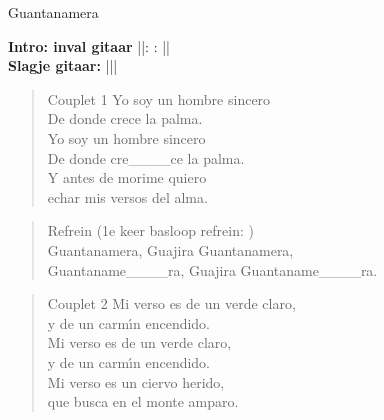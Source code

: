 \begin{song}[son]{Guantanamera}

\textbf{Intro: inval gitaar}
||:  : ||\\
\textbf{Slagje gitaar:}
|\hspace{1em}\hspace{1em}|\hspace{2em}|\\

\begin{verse}{Couplet 1}
  \hspace{1em} Yo soy un hombre sincero
  \\
  \hspace{1em} De donde crece la palma.
  \\
  \hspace{1em} Yo soy un hombre sincero
  \\
  De donde cre\_\_\_\_ce la palma.
  \\
  Y antes de morime quiero
  \\
  echar mis versos del alma.
\end{verse}

\begin{verse}{Refrein}
  (1e keer basloop refrein: )\\
  Guantanamera, \hspace{1em} Guajira Guantanamera,\hspace{1em} 
  \\
  Guantaname\_\_\_\_ra, Guajira Guantaname\_\_\_\_ra.
\end{verse}

\begin{verse}{Couplet 2}
  \hspace{1em} Mi verso es de un verde claro,\\
  \hspace{1em} y de un carm\'{\i}n encendido. \\
  \hspace{1em} Mi verso es de un verde claro, \\
  y de un carm\'{\i}n encendido.  \\
  Mi verso es un ciervo herido, \hspace{1em}  \\
  que busca en el monte amparo. \hspace{1em}
\end{verse}


\end{song}
